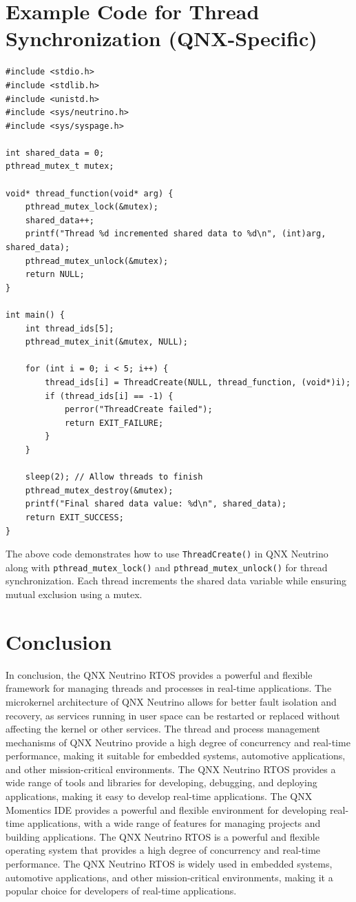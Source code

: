 \documentclass{article}
\begin{document}
\section{Example Code for Thread Synchronization (QNX-Specific)}
\label{sec:example-code-threadcreate-synchronization}
\begin{verbatim}
#include <stdio.h>
#include <stdlib.h>
#include <unistd.h>
#include <sys/neutrino.h>
#include <sys/syspage.h>

int shared_data = 0;
pthread_mutex_t mutex;

void* thread_function(void* arg) {
    pthread_mutex_lock(&mutex);
    shared_data++;
    printf("Thread %d incremented shared data to %d\n", (int)arg, shared_data);
    pthread_mutex_unlock(&mutex);
    return NULL;
}

int main() {
    int thread_ids[5];
    pthread_mutex_init(&mutex, NULL);

    for (int i = 0; i < 5; i++) {
        thread_ids[i] = ThreadCreate(NULL, thread_function, (void*)i);
        if (thread_ids[i] == -1) {
            perror("ThreadCreate failed");
            return EXIT_FAILURE;
        }
    }

    sleep(2); // Allow threads to finish
    pthread_mutex_destroy(&mutex);
    printf("Final shared data value: %d\n", shared_data);
    return EXIT_SUCCESS;
}
\end{verbatim}
The above code demonstrates how to use \texttt{ThreadCreate()} in QNX Neutrino along with \texttt{pthread\_mutex\_lock()} and \texttt{pthread\_mutex\_unlock()} for thread synchronization.
Each thread increments the shared data variable while ensuring mutual exclusion using a mutex.

\section{Conclusion}
\label{sec:conclusion}
In conclusion, the QNX Neutrino RTOS provides a powerful and flexible framework for managing threads and processes in real-time applications.
The microkernel architecture of QNX Neutrino allows for better fault isolation and recovery, as services running in user space can be restarted or replaced without affecting the kernel or other services.
The thread and process management mechanisms of QNX Neutrino provide a high degree of concurrency and real-time performance, making it suitable for embedded systems, automotive applications, and other mission-critical environments.
The QNX Neutrino RTOS provides a wide range of tools and libraries for developing, debugging, and deploying applications, making it easy to develop real-time applications.
The QNX Momentics IDE provides a powerful and flexible environment for developing real-time applications, with a wide range of features for managing projects and building applications.
The QNX Neutrino RTOS is a powerful and flexible operating system that provides a high degree of concurrency and real-time performance.
The QNX Neutrino RTOS is widely used in embedded systems, automotive applications, and other mission-critical environments, making it a popular choice for developers of real-time applications.
\end{document}
